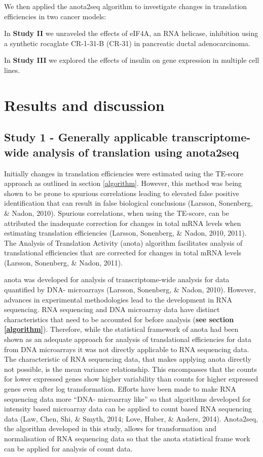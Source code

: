 \documentclass[
  12pt,
  openany]{book}
\begin{document}
We then applied the anota2seq algorithm to investigate changes in translation efficiencies in two cancer models:

In \textbf{Study II} we unraveled the effects of eIF4A, an RNA helicase, inhibition using a synthetic rocaglate CR-1-31-B (CR-31) in pancreatic ductal adenocarcinoma.

In \textbf{Study III} we explored the effects of insulin on gene expression in multiple cell lines.

\chapter{Results and discussion}

\section{Study 1 - Generally applicable transcriptome-wide analysis of translation using anota2seq}

Initially changes in translation efficiencies were estimated using the TE-score approach as outlined in section \ref{algorithm}. However, this method was being shown to be prone to spurious correlations leading to elevated false positive identification that can result in false biological conclusions (Larsson, Sonenberg, \& Nadon, 2010). Spurious correlations, when using the TE-score, can be attributed the inadequate correction for changes in total mRNA levels when estimating translation efficiencies (Larsson, Sonenberg, \& Nadon, 2010, 2011). The Analysis of Translation Activity (anota) algorithm facilitates analysis of translational efficiencies that are corrected for changes in total mRNA levels (Larsson, Sonenberg, \& Nadon, 2011).

anota was developed for analysis of transcriptome-wide analysis for data quantified by DNA- microarrays (Larsson, Sonenberg, \& Nadon, 2010). However, advances in experimental methodologies lead to the development in RNA sequencing. RNA sequencing and DNA microarray data have distinct characteristics that need to be accounted for before analysis (\textbf{see section \ref{algorithm}}). Therefore, while the statistical framework of anota had been shown as an adequate approach for analysis of translational efficiencies for data from DNA microarrays it was not directly applicable to RNA sequencing data. The characteristic of RNA sequencing data, that makes applying anota directly not possible, is the mean variance relationship. This encompasses that the counts for lower expressed genes show higher variability than counts for higher expressed genes even after log transformation. Efforts have been made to make RNA sequencing data more ``DNA- microarray like'' so that algorithms developed for intensity based microarray data can be applied to count based RNA sequencing data (Law, Chen, Shi, \& Smyth, 2014; Love, Huber, \& Anders, 2014). Anota2seq, the algorithm developed in this study, allows for transformation and normalisation of RNA sequencing data so that the anota statistical frame work can be applied for analysis of count data.
\end{document}
